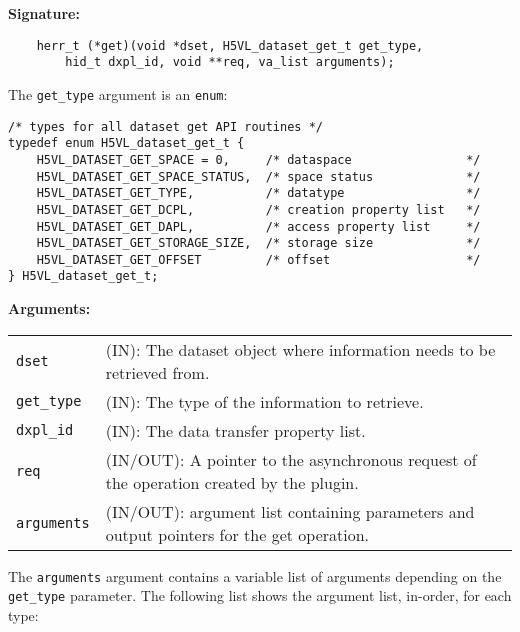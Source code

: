 \textbf{Signature:}
\begin{lstlisting}
    herr_t (*get)(void *dset, H5VL_dataset_get_t get_type, 
        hid_t dxpl_id, void **req, va_list arguments);
\end{lstlisting}

The {\tt get\_type} argument is an {\tt enum}:
\begin{lstlisting}
/* types for all dataset get API routines */
typedef enum H5VL_dataset_get_t {
    H5VL_DATASET_GET_SPACE = 0,     /* dataspace                */
    H5VL_DATASET_GET_SPACE_STATUS,  /* space status             */
    H5VL_DATASET_GET_TYPE,          /* datatype                 */
    H5VL_DATASET_GET_DCPL,          /* creation property list   */
    H5VL_DATASET_GET_DAPL,          /* access property list     */
    H5VL_DATASET_GET_STORAGE_SIZE,  /* storage size             */
    H5VL_DATASET_GET_OFFSET         /* offset                   */
} H5VL_dataset_get_t;
\end{lstlisting}

\textbf{Arguments:}\\
\begin{tabular}{l p{10cm}}
  {\tt dset} & (IN): The dataset object where information needs to be
  retrieved from.\\
  {\tt get\_type} & (IN): The type of the information to retrieve.\\
  {\tt dxpl\_id} & (IN): The data transfer property list.\\
  {\tt req} & (IN/OUT): A pointer to the asynchronous request of the
  operation created by the plugin.\\
  {\tt arguments} & (IN/OUT): argument list containing parameters and
  output pointers for the get operation. \\
\end{tabular}

The {\tt arguments} argument contains a variable list of arguments
depending on the {\tt get\_type} parameter. The following list shows
the argument list, in-order, for each type:

